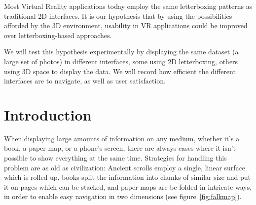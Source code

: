 \documentclass{tufte-book} %
\begin{document}
Most Virtual Reality applications today employ the same letterboxing patterns as traditional 2D interfaces. It is our hypothesis that by using the possibilities afforded by the 3D environment, usability in VR applications could be improved over letterboxing-based approaches.

We will test this hypothesis experimentally by displaying the same dataset (a large set of photos) in different interfaces, some using 2D letterboxing, others using 3D space to display the data. We will record how efficient the different interfaces are to navigate, as well as user satisfaction.




\chapter{Introduction} %

When displaying large amounts of information on any medium, whether it's a book, a paper map, or a phone's screen, there are always cases where it isn't possible to show everything at the same time. Strategies for handling this problem are as old as civilization: Ancient scrolls employ a single, linear surface which is rolled up, books split the information into chunks of similar size and put it on pages which can be stacked, and paper maps are be folded in intricate ways, in order to enable easy navigation in two dimensions (see figure~\ref{fig:falkmap}).
\end{document}
